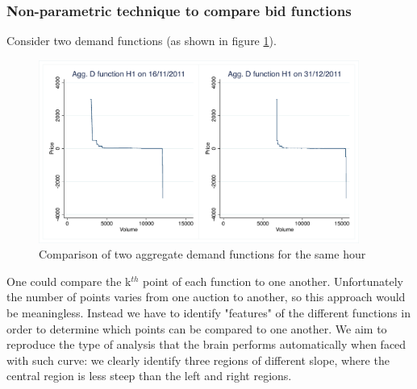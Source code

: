  
\subsubsection{Non-parametric technique to compare bid functions}
\label{comparablepoints}
Consider two demand functions (as shown in figure \ref{comparedfunc}). 
\begin{figure}[!ht]
\centering
\includegraphics[trim=0.1cm 0.1cm 0.1cm 0.1cm, clip=true, height= 60mm]{figch2/compare2d.pdf}
\caption{Comparison of two aggregate demand functions for the same hour}
\label{comparedfunc}
\end{figure}
 One could compare the k$^{th}$ point of each function to one another. Unfortunately the number of points varies from one auction to another, so this approach would be meaningless. Instead we have to identify "features" of the different functions in order to determine which points can be compared to one another. We aim to reproduce the type of analysis that the brain performs automatically when faced with such curve: we clearly identify three regions of different slope, where the central region is less steep than the left and right regions. 

